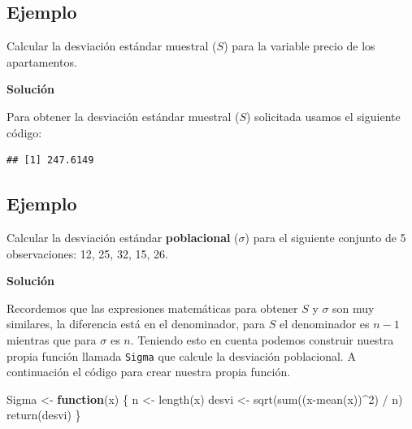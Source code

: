 \documentclass[
]{book}
\makeatletter
\newenvironment{Shaded}{\begin{snugshade}}{\end{snugshade}}
\newcommand{\AttributeTok}[1]{\textcolor[rgb]{0.77,0.63,0.00}{#1}}
\newcommand{\ControlFlowTok}[1]{\textcolor[rgb]{0.13,0.29,0.53}{\textbf{#1}}}
\newcommand{\DecValTok}[1]{\textcolor[rgb]{0.00,0.00,0.81}{#1}}
\newcommand{\FunctionTok}[1]{\textcolor[rgb]{0.00,0.00,0.00}{#1}}
\newcommand{\NormalTok}[1]{#1}
\newcommand{\OtherTok}[1]{\textcolor[rgb]{0.56,0.35,0.01}{#1}}
\newcommand{\SpecialCharTok}[1]{\textcolor[rgb]{0.00,0.00,0.00}{#1}}
\newenvironment{kframe}{%
\medskip{}
\setlength{\fboxsep}{.8em}
 \def\at@end@of@kframe{}%
 \ifinner\ifhmode%
  \def\at@end@of@kframe{\end{minipage}}%
  \begin{minipage}{\columnwidth}%
 \fi\fi%
 \def\FrameCommand##1{\hskip\@totalleftmargin \hskip-\fboxsep
 \colorbox{shadecolor}{##1}\hskip-\fboxsep
     \hskip-\linewidth \hskip-\@totalleftmargin \hskip\columnwidth}%
 \MakeFramed {\advance\hsize-\width
   \@totalleftmargin\z@ \linewidth\hsize
   \@setminipage}}%
 {\par\unskip\endMakeFramed%
 \at@end@of@kframe}
\renewenvironment{Shaded}{\begin{kframe}}{\end{kframe}}
\makeatother
\begin{document}
\hypertarget{ejemplo-39}{%
\subsection*{Ejemplo}\label{ejemplo-39}}

Calcular la desviación estándar muestral (\(S\)) para la variable precio de los apartamentos.

\textbf{Solución}

Para obtener la desviación estándar muestral (\(S\)) solicitada usamos el siguiente código:

\begin{Shaded}
\end{Shaded}

\begin{verbatim}
## [1] 247.6149
\end{verbatim}

\hypertarget{ejemplo-40}{%
\subsection*{Ejemplo}\label{ejemplo-40}}

Calcular la desviación estándar \textbf{poblacional} (\(\sigma\)) para el siguiente conjunto de 5 observaciones: 12, 25, 32, 15, 26.

\textbf{Solución}

Recordemos que las expresiones matemáticas para obtener \(S\) y \(\sigma\) son muy similares, la diferencia está en el denominador, para \(S\) el denominador es \(n-1\) mientras que para \(\sigma\) es \(n\). Teniendo esto en cuenta podemos construir nuestra propia función llamada \texttt{Sigma} que calcule la desviación poblacional. A continuación el código para crear nuestra propia función.

\begin{Shaded}
\begin{Highlighting}[]
\NormalTok{Sigma }\OtherTok{\textless{}{-}} \ControlFlowTok{function}\NormalTok{(x) \{}
\NormalTok{  n }\OtherTok{\textless{}{-}} \FunctionTok{length}\NormalTok{(x)}
\NormalTok{  desvi }\OtherTok{\textless{}{-}} \FunctionTok{sqrt}\NormalTok{(}\FunctionTok{sum}\NormalTok{((x}\SpecialCharTok{{-}}\FunctionTok{mean}\NormalTok{(x))}\SpecialCharTok{\^{}}\DecValTok{2}\NormalTok{) }\SpecialCharTok{/}\NormalTok{ n)}
  \FunctionTok{return}\NormalTok{(desvi)}
\NormalTok{\} }
\end{Highlighting}
\end{Shaded}
\end{document}
